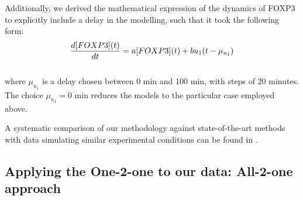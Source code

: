 \documentclass[oneside, 10pt, a4paper, twocolumn]{article}
\begin{document}
{Additionally, we derived the mathematical expression of the dynamics of FOXP3 to explicitly include a delay in the modelling, such that it took the following form:\\
\begin{equation}
\frac{d[FOXP3](t)}{dt} = a [FOXP3](t) + b u_1(t-\mu_{u_1}) \\ \\
\label{DelayEq}
\end{equation}\\
where $\mu_{u_1}$ is a delay chosen between $0$ min and $100$ min, with steps of $20$ minutes. The choice $\mu_{u_1} = 0$ min reduces the models to the particular case employed above.




A systematic comparison of our methodology against state-of-the-art methods with data simulating similar experimental conditions can be found in \citep{mombaerts2019multifactorial}. 


\subsection{Applying the One-2-one to our data: All-2-one approach}    
\label{SISubSection:All-2-one}

}
\end{document}

